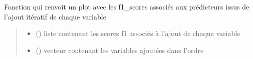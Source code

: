 \documentclass[letterpaper,10pt,french]{sphinxmanual}
\begin{document}
\begin{fulllineitems}
\label{\detokenize{KNN_sel_var:KNN_sel_var.plot_vars}}
\pysigstartsignatures
{}
\pysigstopsignatures
\sphinxAtStartPar
Fonction qui renvoit un plot avec les f1\_scores associés aux prédicteurs issus de l’ajout itératif de chaque variable
\begin{quote}\begin{description}
\begin{itemize}
\item {} 
\sphinxAtStartPar
{} () \textendash{} liste contenant les scores f1 associés à l’ajout de chaque variable

\item {} 
\sphinxAtStartPar
{} () \textendash{} vecteur contenant les variables ajoutées dans l’ordre

\end{itemize}

\end{description}\end{quote}

\end{fulllineitems}

\end{document}
